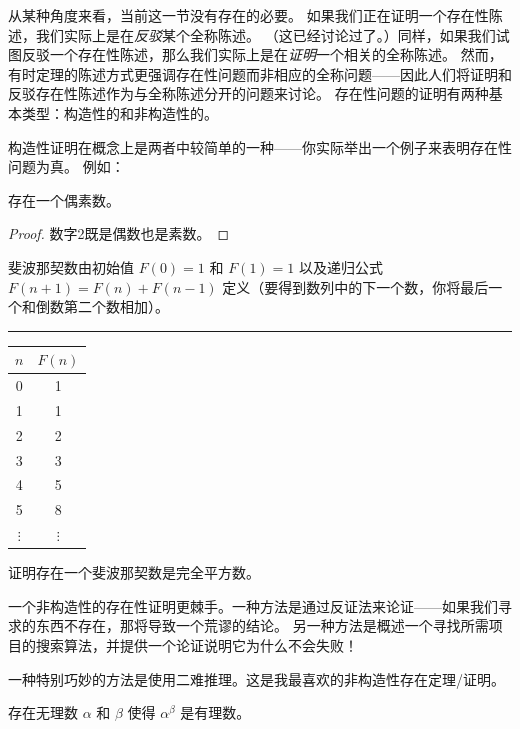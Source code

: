 从某种角度来看，当前这一节没有存在的必要。
如果我们正在证明一个存在性陈述，我们实际上是在\emph{反驳}某个全称陈述。
（这已经讨论过了。）同样，如果我们试图反驳一个存在性陈述，那么我们实际上是在\emph{证明}一个相关的全称陈述。
然而，有时定理的陈述方式更强调存在性问题而非相应的全称问题——因此人们将证明和反驳存在性陈述作为与全称陈述分开的问题来讨论。
存在性问题的证明有两种基本类型：构造性的和非构造性的。

构造性证明在概念上是两者中较简单的一种——你实际举出一个例子来表明存在性问题为真。
例如：

\begin{thm}
      存在一个偶素数。
\end{thm}

\begin{proof}
      数字2既是偶数也是素数。
\end{proof}

\begin{exer}     
      斐波那契数由初始值 $F(0)=1$ 和 $F(1)=1$ 以及递归公式 $F(n+1) = F(n)+F(n-1)$ 定义（要得到数列中的下一个数，你将最后一个和倒数第二个数相加）。

      \rule{72pt}{0pt} \begin{tabular}{c|c}
            $n$      & $F(n)$   \\ \hline
            0        & 1        \\
            1        & 1        \\
            2        & 2        \\
            3        & 3        \\
            4        & 5        \\
            5        & 8        \\
            $\vdots$ & $\vdots$ \\
      
      \end{tabular}
      \medskip

      证明存在一个斐波那契数是完全平方数。
\end{exer}

一个非构造性的存在性证明更棘手。一种方法是通过反证法来论证——如果我们寻求的东西不存在，那将导致一个荒谬的结论。
另一种方法是概述一个寻找所需项目的搜索算法，并提供一个论证说明它为什么不会失败！

一种特别巧妙的方法是使用二难推理。这是我最喜欢的非构造性存在定理/证明。
\begin{thm}    
      存在无理数 $\alpha$ 和 $\beta$ 使得 $\alpha^\beta$ 是有理数。
\end{thm}

